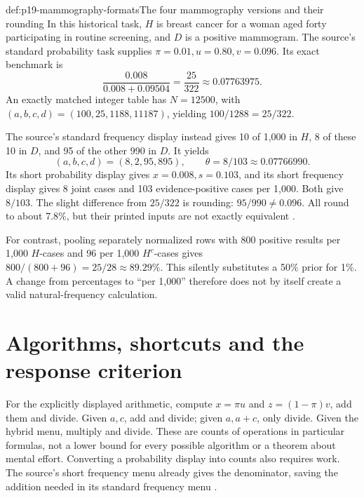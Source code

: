\begin{hbexample}{def:p19-mammography-formats}{The four mammography versions and their rounding}
In this historical task, \(H\) is breast cancer for a woman aged forty
participating in routine screening, and \(D\) is a positive mammogram.
The source's standard probability task supplies
\(\pi=0.01,u=0.80,v=0.096\). Its exact benchmark is
\[
 \frac{0.008}{0.008+0.09504}=\frac{25}{322}
 \approx0.07763975.
\]
An exactly matched integer table has \(N=12500\), with
\((a,b,c,d)=(100,25,1188,11187)\), yielding \(100/1288=25/322\).

The source's standard frequency display instead gives 10 of 1,000 in \(H\),
8 of these 10 in \(D\), and 95 of the other 990 in \(D\). It yields
\[
 (a,b,c,d)=(8,2,95,895),\qquad \theta=8/103\approx0.07766990.
\]
Its short probability display gives \(x=0.008,s=0.103\), and its short
frequency display gives 8 joint cases and 103 evidence-positive cases per
1,000. Both give \(8/103\). The slight difference from \(25/322\) is
rounding: \(95/990\ne0.096\). All round to about 7.8\%, but their
printed inputs are not exactly equivalent
\cite[pp.~685--688, table~1]{GigerenzerHoffrage1995FrequencyFormats}.

For contrast, pooling separately normalized rows with 800 positive results
per 1,000 \(H\)-cases and 96 per 1,000 \(H^c\)-cases gives
\(800/(800+96)=25/28\approx89.29\%\). This silently substitutes a
50\% prior for 1\%. A change from percentages to ``per 1,000'' therefore
does not by itself create a valid natural-frequency calculation.
\end{hbexample}

\section{Algorithms, shortcuts and the response criterion}
\label{sec:p19-frequency-algorithms}

For the explicitly displayed arithmetic, compute \(x=\pi u\) and
\(z=(1-\pi)v\), add them and divide. Given \(a,c\), add and divide;
given \(a,a+c\), only divide. Given the hybrid menu, multiply and divide.
These are counts of operations in particular formulas, not a lower bound
for every possible algorithm or a theorem about mental effort. Converting
a probability display into counts also requires work. The source's short
frequency menu already gives the denominator, saving the addition needed
in its standard frequency menu
\cite[pp.~687--689, 694]{GigerenzerHoffrage1995FrequencyFormats}.


